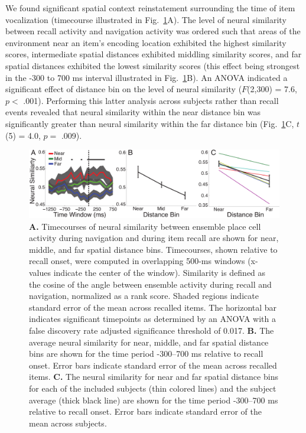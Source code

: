 We found significant spatial context reinstatement surrounding the time of item vocalization (timecourse illustrated in Fig.~\ref{fig:reinstate}A). The level of neural similarity between recall activity and navigation activity was ordered such that areas of the environment near  an item's encoding location exhibited the highest similarity scores, intermediate spatial distances exhibited middling similarity scores, and far spatial distances exhibited the lowest similarity scores (this effect being strongest in the -300 to 700 ms interval illustrated in Fig.~\ref{fig:reinstate}B).  An ANOVA indicated a significant effect of distance bin on the level of neural similarity ($F$(2,300) = 7.6, $p <$ .001). Performing this latter analysis across subjects rather than recall events revealed that neural similarity within the near distance bin was significantly greater than neural similarity within the far distance bin (Fig.~\ref{fig:reinstate}C, $t$(5) = 4.0, $p =$ .009).   

\begin{figure}[t]
\centering
  \includegraphics[width=1\textwidth]{./tex/dboy/figs/fig3}
  \caption[Timecourse of neural similarity]{\textbf{A.} Timecourses of neural similarity between ensemble place cell activity during navigation and during item recall are shown for near, middle, and far spatial distance bins.  Timecourses, shown relative to recall onset, were  computed in overlapping 500-ms windows (x-values indicate the center of the window).  Similarity is defined as the cosine of the angle between ensemble activity during recall and navigation, normalized as a rank score. Shaded regions indicate standard error of the mean across recalled items. The horizontal bar indicates significant timepoints as determined by an ANOVA with a false discovery rate adjusted significance threshold of 0.017.  \textbf{B.} The average neural similarity for near, middle, and far spatial distance bins are shown for the time period -300--700 ms relative to recall onset. Error bars indicate standard error of the mean across recalled items.  \textbf{C.} The neural similarity for near and far spatial distance bins for each of the included subjects (thin colored lines) and the subject average (thick black line) are shown for the  time period -300--700 ms relative to recall onset. Error bars indicate standard error of the mean across subjects.}
\label{fig:reinstate}
\end{figure}

